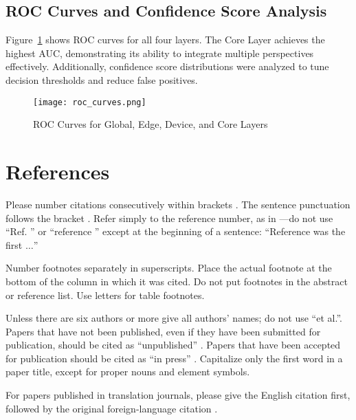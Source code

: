 \documentclass[conference]{IEEEtran}
\begin{document}
\subsection{ROC Curves and Confidence Score Analysis}
Figure~\ref{fig:roc_all} shows ROC curves for all four layers. The Core Layer achieves the highest AUC, demonstrating its ability to integrate multiple perspectives effectively. Additionally, confidence score distributions were analyzed to tune decision thresholds and reduce false positives.

\begin{figure}[htbp]
\centerline{\texttt{[image: roc\_curves.png]}}
\caption{ROC Curves for Global, Edge, Device, and Core Layers}
\label{fig:roc_all}
\end{figure}

\section*{References}

Please number citations consecutively within brackets \cite{b1}. The 
sentence punctuation follows the bracket \cite{b2}. Refer simply to the reference 
number, as in \cite{b3}---do not use ``Ref. \cite{b3}'' or ``reference \cite{b3}'' except at 
the beginning of a sentence: ``Reference \cite{b3} was the first $\ldots$''

Number footnotes separately in superscripts. Place the actual footnote at 
the bottom of the column in which it was cited. Do not put footnotes in the 
abstract or reference list. Use letters for table footnotes.

Unless there are six authors or more give all authors' names; do not use 
``et al.''. Papers that have not been published, even if they have been 
submitted for publication, should be cited as ``unpublished'' \cite{b4}. Papers 
that have been accepted for publication should be cited as ``in press'' \cite{b5}. 
Capitalize only the first word in a paper title, except for proper nouns and 
element symbols.

For papers published in translation journals, please give the English 
citation first, followed by the original foreign-language citation \cite{b6}.
\end{document}
